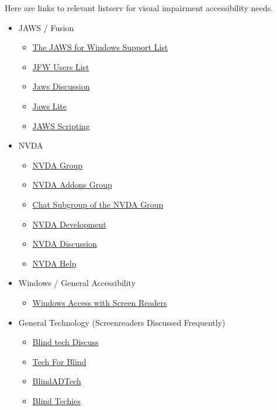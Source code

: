 Here are links to relevant listserv for visual impairment accessibility needs.
\begin{itemize}[leftmargin=*]
 \item JAWS / Fusion
 \begin{itemize}[leftmargin=2em]
 \item \href{http://www.groups.io/g/jfw/}{The JAWS for Windows Support List}
 \item \href{http://groups.io/g/jfw-users/}{JFW Users List}
 \item \href{http://groups.io/g/jawsdiscussion/}{Jaws Discussion}
 \item \href{http://groups.io/g/jawslite/}{Jaws Lite} 
 \item \href{http://groups.io/g/jawsscripting/}{JAWS Scripting} 
 \end{itemize}
 \item NVDA
 \begin{itemize}[leftmargin=2em]
 \item \href{http://nvda.groups.io/g/nvda/ }{NVDA Group} 
 \item \href{http://nvda-addons.groups.io/g/nvda-addons}{NVDA Addons Group} 
 \item \href{http://nvda.groups.io/g/chat/ }{Chat Subgroup of the NVDA Group} 
 \item \href{http://groups.io/g/nvda-devel/messages}{NVDA Development} 
 \item \href{http://groups.io/g/nvdadiscussion/messages}{NVDA Discussion} 
 \item \href{http://groups.io/g/NVDAhelp/messages}{NVDA Help} 
 \end{itemize}
 \item Windows / General Accessibility
 \begin{itemize}[leftmargin=2em]
 \item \href{http://winaccess.groups.io/g/winaccess}{Windows Access with Screen Readers} 
 \end{itemize}
 \item General Technology (Screenreaders Discussed Frequently)
 \begin{itemize}[leftmargin=2em]
 \item \href{http://groups.io/g/blindtechdiscuss/messages}{Blind tech Discuss} 
 \item \href{http://groups.io/g/tech-for-blind}{Tech For Blind} 
 \item \href{http://groups.io/g/blindadtech}{BlindADTech} 
 \item \href{http://groups.io/g/blind-techies/messages}{Blind Techies} 
 \end{itemize}
\end{itemize}